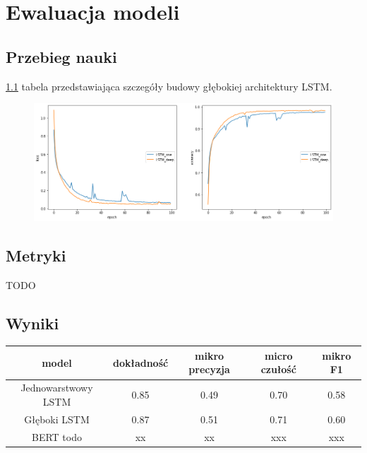 \chapter{Ewaluacja modeli}

\section{Przebieg nauki}

\ref{rys:lstm_one_deep_comparison} tabela przedstawiająca szczegóły budowy głębokiej architektury LSTM.

\begin{figure}[t]
\centering\includegraphics[width=\textwidth]{figures/reports/lstm_one_deep_comparison.png}
\label{rys:lstm_one_deep_comparison}
\end{figure}

\section{Metryki}

TODO

\section{Wyniki}

\begin{table}[t]
\label{tab:tabela_results}
\centering\footnotesize%
\begin{tabular}{c c c c c}
\toprule
model & dokładność & mikro precyzja & micro czułość & mikro F1 \\
\midrule
Jednowarstwowy LSTM   & 0.85 & 0.49 & 0.70 & 0.58 \\
Głęboki LSTM   & 0.87 & 0.51 & 0.71 & 0.60 \\
BERT todo   & xx & xx & xxx & xxx \\
\bottomrule
\end{tabular}
\end{table}